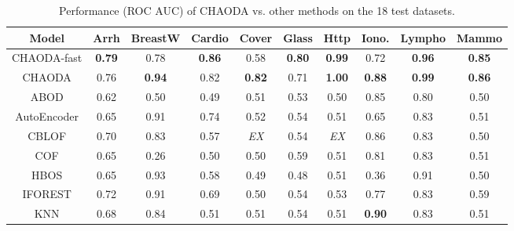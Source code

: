 \begin{table*}[!t]
\caption{Performance (ROC AUC) of CHAODA vs. other methods on the 18 test datasets.}
\label{table:results:test-performance}
\vskip 0.15in
\begin{center}
\begin{small}
\begin{sc}
\begin{tabular}{|c|c|c|c|c|c|c|c|c|c|}
\hline
\textbf{Model} & \textbf{Arrh} & \textbf{BreastW} & \textbf{Cardio} & \textbf{Cover} & \textbf{Glass} & \textbf{Http} & \textbf{Iono.} & \textbf{Lympho} & \textbf{Mammo} \\
\hline
CHAODA-fast    & \textbf{0.79} &             0.78 &   \textbf{0.86} &           0.58 & \textbf{0.80}  & \textbf{0.99} &           0.72 &   \textbf{0.96} &  \textbf{0.85} \\
\hline
CHAODA         &          0.76 &    \textbf{0.94} &            0.82 &  \textbf{0.82} &           0.71 & \textbf{1.00} &  \textbf{0.88} &   \textbf{0.99} &  \textbf{0.86} \\
\hline
ABOD           &          0.62 &             0.50 &            0.49 &           0.51 &           0.53 &          0.50 &           0.85 &            0.80 &           0.50 \\
\hline
AutoEncoder    &          0.65 &             0.91 &            0.74 &           0.52 &           0.54 &          0.51 &           0.65 &            0.83 &           0.51 \\
\hline
CBLOF          &          0.70 &             0.83 &            0.57 &    \textit{EX} &           0.54 &   \textit{EX} &           0.86 &            0.83 &           0.50 \\
\hline
COF            &          0.65 &             0.26 &            0.50 &           0.50 &           0.59 &          0.51 &           0.81 &            0.83 &           0.51 \\
\hline
HBOS           &          0.65 &             0.93 &            0.58 &           0.49 &           0.48 &          0.51 &           0.36 &            0.91 &           0.50 \\
\hline
IFOREST        &          0.72 &             0.91 &            0.69 &           0.50 &           0.54 &          0.53 &           0.77 &            0.83 &           0.59 \\
\hline
KNN            &          0.68 &             0.84 &            0.51 &           0.51 &           0.54 &          0.51 &  \textbf{0.90} &            0.83 &           0.51 \\

\end{tabular}
\end{sc}
\end{small}
\end{center}
\end{table*}
